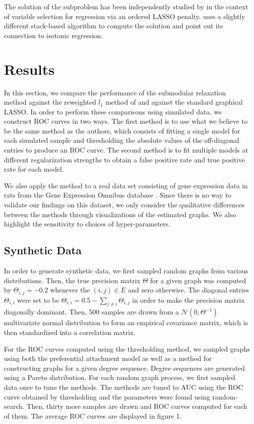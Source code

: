 \documentclass{uwstat572}
\theoremstyle{remark}
\theoremstyle{definition}
\begin{document}
The solution of the subproblem has been independently studied by \cite{su2016} in the context of variable selection for regression via an ordered LASSO penalty.  \cite{su2016} uses a slightly different stack-based algorithm to compute the solution and point out its connection to isotonic regression.


\section{Results}

In this section, we compare the performance of the submodular relaxation method against the reweighted $l_1$ method of \cite{liu11c} and against the standard graphical LASSO.  In order to perform these comparisons using simulated data, we construct ROC curves in two ways.  The first method is to use what we believe to be the same method as the authors, which consists of fitting a single model for each simulated sample and thresholding the absolute values of the off-diagonal entries to produce an ROC curve.  The second method is to fit multiple models at different regularization strengths to obtain a false positive rate and true positive rate for each model.

We also apply the method to a real data set consisting of gene expression data in rats from the Gene Expression Omnibus database \citep{gds}.  Since there is no way to validate our findings on this dataset, we only consider the qualitative differences between the methods through visualizations of the estimated graphs. We also highlight the sensitivity to choices of hyper-parameters.

\subsection{Synthetic Data}

In order to generate synthetic data, we first sampled random graphs from various distributions.  Then, the true precision matrix $\Theta$ for a given graph was computed by $\Theta_{i,j} = -0.2$ whenever the $(i,j) \in E$ and zero otherwise.  The diagonal entries $\Theta_{i,i}$ were set to be $\Theta_{i,i} = 0.5 - \sum_{j \neq i} \Theta_{i,j}$ in order to make the precision matrix diagonally dominant.  Then, 500 samples are drawn from a  $\mathcal{N}(0,\Theta^{-1})$ multivariate normal distribution to form an empirical covariance matrix, which is then standardized into a correlation matrix.

For the ROC curves computed using the thresholding method, we sampled graphs using both the preferential attachment model as well as a method for constructing graphs for a given degree sequence.  Degree sequences are generated using a Pareto distribution. For each random graph process, we first sampled data once to tune the methods.   The methods are tuned to AUC using the ROC curve obtained by thresholding and the parameters were found using random-search.  Then, thirty more samples are drawn and ROC curves computed for each of them.  The average ROC curves are displayed in figure 1.
\end{document}
